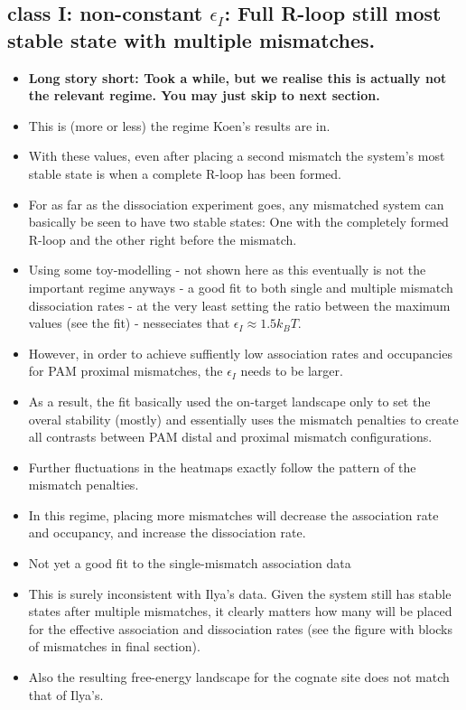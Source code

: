 \documentclass[a4paper,twoside]{revtex4-1}
\begin{document}
\subsection{class I: non-constant $\epsilon_I$: Full R-loop still most stable state with multiple mismatches.}
 
\begin{itemize}
\item \textbf{Long story short: Took a while, but we realise this is actually not the relevant regime. You may just skip to next section.}
\item This is (more or less) the regime Koen's results are in.
\item With these values, even after placing a second mismatch the system's most stable state is when a complete R-loop has been formed. 
\item For as far as the dissociation experiment goes, any mismatched system can basically be seen to have two stable states: One with the completely formed R-loop and the other right before the mismatch.
\item Using some toy-modelling - not shown here as this eventually is not the important regime anyways - a good fit to both single and multiple mismatch dissociation rates - at the very least setting the ratio between the maximum values (see the fit) - nesseciates that $\epsilon_I \approx 1.5 k_BT$. 
\item However, in order to achieve suffiently low association rates and occupancies for PAM proximal mismatches, the $\epsilon_I$ needs to be larger. 
\item As a result, the fit basically used the on-target landscape only to set the overal stability (mostly) and essentially uses the mismatch penalties to create all contrasts between PAM distal and proximal mismatch configurations. 
\item Further fluctuations in the heatmaps exactly follow the pattern of the mismatch penalties. 
\item In this regime, placing more mismatches will decrease the association rate and occupancy, and increase the dissociation rate. 
\item Not yet a good fit to the single-mismatch association data
\item This is surely inconsistent with Ilya's data. Given the system still has stable states after multiple mismatches, it clearly matters how many will be placed for the effective association and dissociation rates (see the figure with blocks of mismatches in final section). 
\item Also the resulting free-energy landscape for the cognate site does not match that of Ilya's.
\end{itemize}
\end{document}
